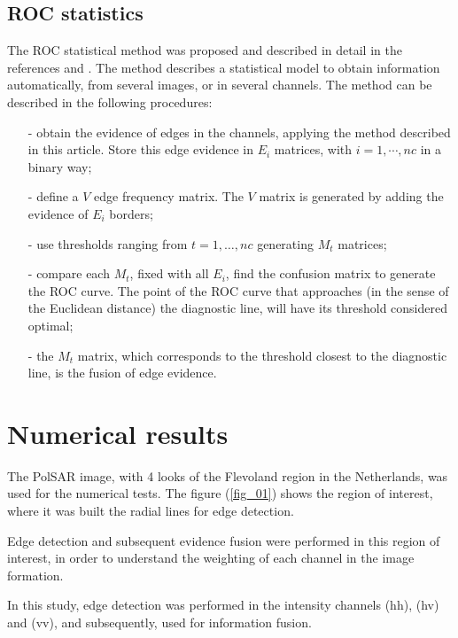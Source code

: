 \documentclass[conference]{IEEEtran}
\begin{document}
\subsection{ROC statistics}
The ROC statistical method was proposed and described in detail in the references \cite{gs} and \cite{fawcett}. The method describes a statistical model to obtain information automatically, from several images, or in several channels. The method can be described in the following procedures:
\begin{itemize}
\item[-] obtain the evidence of edges in the channels, applying the method described in this article. Store this edge evidence in $E_i$ matrices, with $i=1,\cdots,nc$ in a binary way;
\item[-] define a $V$ edge frequency matrix. The $V$ matrix is generated by adding the evidence of $E_i$ borders;
\item[-] use thresholds ranging from $t=1,\dots,nc$ generating $M_t$ matrices;
\item[-] compare each $M_t$, fixed with all $E_i$, find the confusion matrix to generate the ROC curve. The point of the ROC curve that approaches (in the sense of the Euclidean distance) the diagnostic line, will have its threshold considered optimal;
\item[-] the $M_t$ matrix, which corresponds to the threshold closest to the diagnostic line, is the fusion of edge evidence.
\end{itemize}

\section{Numerical results}\label{sec_07}
The PolSAR image, with 4 looks of the Flevoland region in the Netherlands, was used for the numerical tests. The figure (\ref{fig_01}) shows the region of interest, where it was built the radial lines for edge detection.

 Edge detection and subsequent evidence fusion were performed in this region of interest, in order to understand the weighting of each channel in the image formation.

In this study, edge detection was performed in the intensity channels (hh), (hv) and (vv), and subsequently, used for information fusion. 
\end{document}
